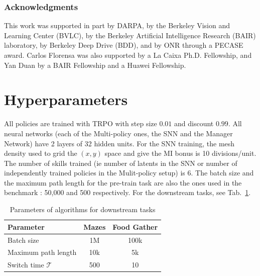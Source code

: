 \documentclass{article} %
\begin{document}
\subsubsection*{Acknowledgments}
This work was supported in part by DARPA, by the Berkeley Vision and Learning Center (BVLC), by the Berkeley Artificial Intelligence Research (BAIR) laboratory, by Berkeley Deep Drive (BDD), and by ONR through a PECASE award. Carlos Florensa was also supported by a La Caixa Ph.D. Fellowship, and Yan Duan by a BAIR Fellowship and a Huawei Fellowship.





\appendix
\section{Hyperparameters}
\label{sec:hyper}
All policies are trained with TRPO with step size $0.01$ and discount $0.99$. All neural networks (each of the Multi-policy ones, the SNN and the Manager Network) have 2 layers of 32 hidden units. For the SNN training, the mesh density used to grid the $(x, y)$ space and give the MI bonus is 10 divisions/unit. The number of skills trained (ie number of latents in the SNN or number of independently trained policies in the Mulit-policy setup) is 6. The batch size and the maximum path length for the pre-train task are also the ones used in the benchmark \citep{duan2016benchmarking}: 50,000 and 500 respectively. For the downstream tasks, see Tab.\ \ref{tab:params}.

\begin{table}[h!]
\centering
\begin{tabular}[t]{l|c|c}
Parameter & Mazes & Food Gather \\
\hline
Batch size & 1M & 100k \\
Maximum path length & 10k & 5k \\
Switch time $\mathcal{T}$ & 500 & 10
\end{tabular}
\caption{Parameters of algorithms for downstream tasks}
\label{tab:params}
\end{table}

\end{document}
